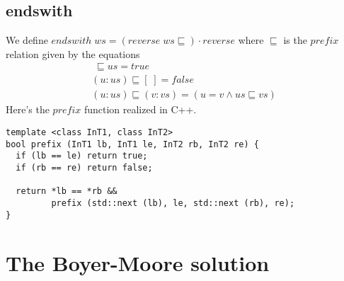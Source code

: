 \documentclass{article}
\begin{document}
\subsection{endswith}
We define \(endswith\;ws = (reverse\;ws\sqsubseteq)\cdot reverse\)
where \( \sqsubseteq \) is the \(prefix\) relation given by the
equations
\begin{gather*}
[\;]\;\sqsubseteq us = true \\
(u:us) \sqsubseteq [\;] = false \\
(u:us) \sqsubseteq (v:vs) = (u = v \land us \sqsubseteq vs)
\end{gather*}
Here's the \(prefix\) function realized in C++.
\begin{verbatim}
template <class InT1, class InT2>
bool prefix (InT1 lb, InT1 le, InT2 rb, InT2 re) {
  if (lb == le) return true;
  if (rb == re) return false;

  return *lb == *rb && 
         prefix (std::next (lb), le, std::next (rb), re);
}
\end{verbatim}

\section{The Boyer-Moore solution}
\end{document}
